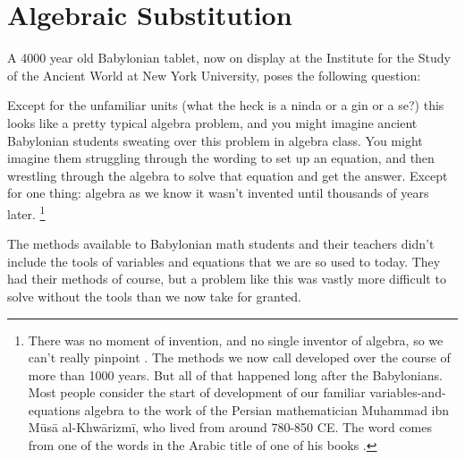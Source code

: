 %
%

\section{Algebraic Substitution}
\label{AlgebraicSubstitution}

A 4000 year old Babylonian tablet, now on display at the Institute for the Study of the Ancient World at New York University, poses the following question:


\bigskip

Except for the unfamiliar units (what the heck is a ninda or a gin or a se?) this looks like a pretty typical algebra problem, and you might imagine ancient Babylonian students sweating over this problem in algebra class. You might imagine them struggling through the wording to set up an equation, and then wrestling through the algebra to solve that equation and get the answer.  Except for one thing: algebra as we know it wasn’t invented until thousands of years later.  \footnote{There was no moment of invention, and no single inventor of algebra, so we can’t really pinpoint . The methods we now call  developed over the course of more than 1000 years. But all of that happened long after the Babylonians. Most people consider the start of development of our familiar 	variables-and-equations algebra to the work of the Persian mathematician Muhammad ibn Mūsā al-Khwārizmī, who lived from around 780-850 CE. The word  comes from one of the words in the Arabic title of one of his books .}

The methods available to Babylonian math students and their teachers didn’t include the tools of variables and equations that we are so used to today. They had their methods of course, but a problem like this was vastly more difficult to solve without the tools than we now take for granted.

